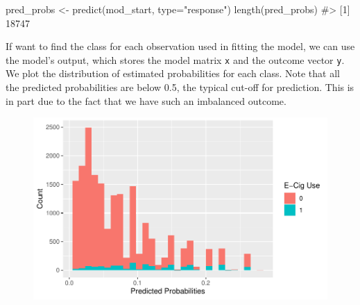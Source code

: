 \documentclass[
  letterpaper,
]{krantz}
\makeatletter
\newenvironment{Shaded}{\begin{snugshade}}{\end{snugshade}}
\newcommand{\AttributeTok}[1]{\textcolor[rgb]{0.40,0.45,0.13}{#1}}
\newcommand{\CommentTok}[1]{\textcolor[rgb]{0.37,0.37,0.37}{#1}}
\newcommand{\DecValTok}[1]{\textcolor[rgb]{0.68,0.00,0.00}{#1}}
\newcommand{\FunctionTok}[1]{\textcolor[rgb]{0.28,0.35,0.67}{#1}}
\newcommand{\NormalTok}[1]{\textcolor[rgb]{0.00,0.23,0.31}{#1}}
\newcommand{\OtherTok}[1]{\textcolor[rgb]{0.00,0.23,0.31}{#1}}
\newcommand{\SpecialCharTok}[1]{\textcolor[rgb]{0.37,0.37,0.37}{#1}}
\newcommand{\StringTok}[1]{\textcolor[rgb]{0.13,0.47,0.30}{#1}}
\newenvironment{kframe}{%
\medskip{}
\setlength{\fboxsep}{.8em}
 \def\at@end@of@kframe{}%
 \ifinner\ifhmode%
  \def\at@end@of@kframe{\end{minipage}}%
  \begin{minipage}{\columnwidth}%
 \fi\fi%
 \def\FrameCommand##1{\hskip\@totalleftmargin \hskip-\fboxsep
 \colorbox{shadecolor}{##1}\hskip-\fboxsep
     \hskip-\linewidth \hskip-\@totalleftmargin \hskip\columnwidth}%
 \MakeFramed {\advance\hsize-\width
   \@totalleftmargin\z@ \linewidth\hsize
   \@setminipage}}%
 {\par\unskip\endMakeFramed%
 \at@end@of@kframe}
\renewenvironment{Shaded}{\begin{kframe}}{\end{kframe}}
\makeatother
\begin{document}
\begin{Shaded}
\begin{Highlighting}[]
\NormalTok{pred\_probs }\OtherTok{\textless{}{-}} \FunctionTok{predict}\NormalTok{(mod\_start, }\AttributeTok{type=}\StringTok{"response"}\NormalTok{)}
\FunctionTok{length}\NormalTok{(pred\_probs)}
\CommentTok{\#\textgreater{} [1] 18747}
\end{Highlighting}
\end{Shaded}

If want to find the class for each observation used in fitting the
model, we can use the model's output, which stores the model matrix
\texttt{x} and the outcome vector \texttt{y}. We plot the distribution
of estimated probabilities for each class. Note that all the predicted
probabilities are below 0.5, the typical cut-off for prediction. This is
in part due to the fact that we have such an imbalanced outcome.

\begin{Shaded}
\end{Shaded}

\begin{figure}[H]

{\centering \includegraphics[width=1\textwidth,height=\textheight]{book/11_logistic_regression_files/figure-pdf/unnamed-chunk-9-1.pdf}

}

\end{figure}
\end{document}
